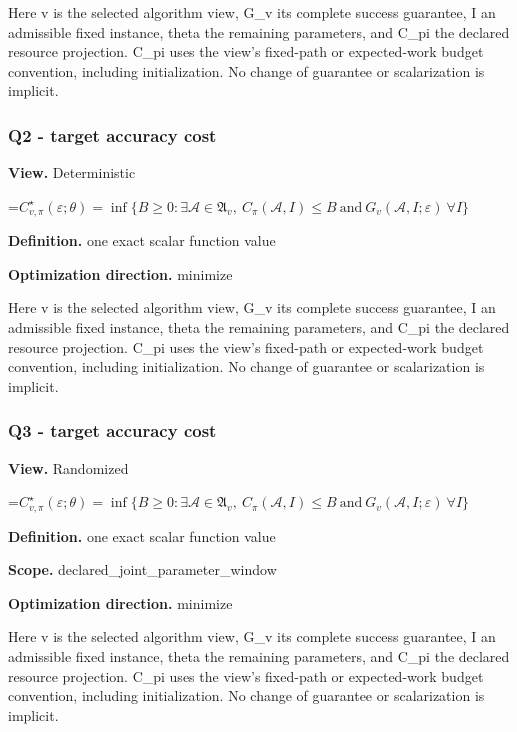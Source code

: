 \documentclass[10pt,a4paper]{article}
\newcommand{\AtlasMath}[1]{\par\begingroup\centering\setbox0=\hbox{$\displaystyle #1$}\ifdim\wd0>1.4\linewidth\typeout{ATLAS WIDE FORMULA: \the\wd0}\fi\ifdim\wd0>\linewidth\resizebox{\linewidth}{!}{\box0}\else\box0\fi\par\endgroup}
\begin{document}
Here v is the selected algorithm view, G\_\allowbreak{}v its complete success guarantee, I an admissible fixed instance, theta the remaining parameters, and C\_\allowbreak{}pi the declared resource projection. C\_\allowbreak{}pi uses the view's fixed-path or expected-work budget convention, including initialization. No change of guarantee or scalarization is implicit.

\subsubsection{Q2 - target accuracy cost}
\textbf{View.} Deterministic

\AtlasMath{C^\star_{v,\pi}(\varepsilon;\theta)=\inf\{B\ge0:\exists\mathcal A\in\mathfrak A_v,\ C_\pi(\mathcal A,I)\le B\ \text{and}\ G_v(\mathcal A,I;\varepsilon)\ \forall I\}}
\textbf{Definition.} one exact scalar function value

\textbf{Optimization direction.} minimize

Here v is the selected algorithm view, G\_\allowbreak{}v its complete success guarantee, I an admissible fixed instance, theta the remaining parameters, and C\_\allowbreak{}pi the declared resource projection. C\_\allowbreak{}pi uses the view's fixed-path or expected-work budget convention, including initialization. No change of guarantee or scalarization is implicit.

\subsubsection{Q3 - target accuracy cost}
\textbf{View.} Randomized

\AtlasMath{C^\star_{v,\pi}(\varepsilon;\theta)=\inf\{B\ge0:\exists\mathcal A\in\mathfrak A_v,\ C_\pi(\mathcal A,I)\le B\ \text{and}\ G_v(\mathcal A,I;\varepsilon)\ \forall I\}}
\textbf{Definition.} one exact scalar function value

\textbf{Scope.} declared\_\allowbreak{}joint\_\allowbreak{}parameter\_\allowbreak{}window

\textbf{Optimization direction.} minimize

Here v is the selected algorithm view, G\_\allowbreak{}v its complete success guarantee, I an admissible fixed instance, theta the remaining parameters, and C\_\allowbreak{}pi the declared resource projection. C\_\allowbreak{}pi uses the view's fixed-path or expected-work budget convention, including initialization. No change of guarantee or scalarization is implicit.
\end{document}
